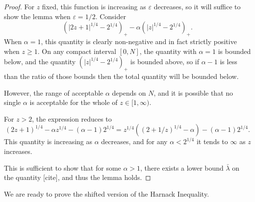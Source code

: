 \documentclass[11pt]{amsart}
\theoremstyle{remark}
\theoremstyle{definition}
\newcommand{\eps}{\varepsilon}
\newcommand{\paren}[1]{\left( #1 \right)}
\begin{document}
\begin{proof}
For $z$ fixed, this function is increasing as $\eps$ decreases, so it will suffice to show the lemma when $\eps = 1/2$.  Consider
\[ \paren{|2 z + 1|^{1/4} - 2^{1/4}}_+ - \alpha \paren{|z|^{1/4} - 2^{1/4}}_+. \]
When $\alpha = 1$, this quantity is clearly non-negative and in fact strictly positive when $z \geq 1$.  On any compact interval $[0,N]$, the quantity with $\alpha = 1$ is bounded below, and the quantity $\paren{|z|^{1/4} - 2^{1/4}}_+$ is bounded above, so if $\alpha-1$ is less than the ratio of those bounds then the total quantity will be bounded below.  

However, the range of acceptable $\alpha$ depends on $N$, and it is possible that no single $\alpha$ is acceptable for the whole of $z \in [1,\infty)$.  

For $z > 2$, the expression reduces to
\[ (2z+1)^{1/4} - \alpha z^{1/4} - (\alpha-1) 2^{1/4} = z^{1/4} \paren{(2 + 1/z)^{1/4} - \alpha} - (\alpha-1)2^{1/4}. \]
This quantity is increasing as $\alpha$ decreases, and for any $\alpha < 2^{1/4}$ it tends to $\infty$ as $z$ increases. 

This is sufficient to show that for some $\alpha > 1$, there exists a lower bound $\bar{\lambda}$ on the quantity [cite], and thus the lemma holds. 
\end{proof}

We are ready to prove the shifted version of the Harnack Inequality.  
\end{document}
